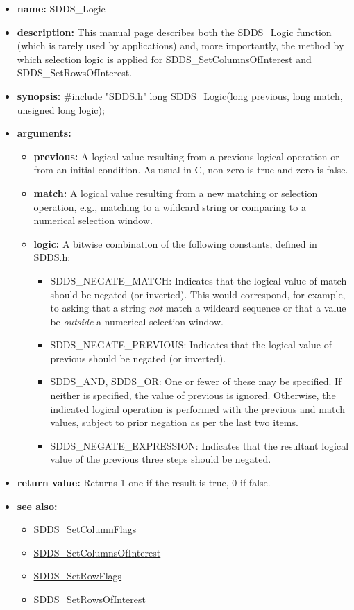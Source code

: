 \documentclass[11pt]{article}
\newcommand{\progref}[1]{\hyperref{SDDS_#1}{{\tt SDDS\_#1} (}{)}{SDDS_#1}}
\begin{document}
\begin{itemize}
\item {\bf name:}\newline
SDDS\_Logic
\item {\bf description:}\newline
This manual page describes both the SDDS\_Logic function (which is rarely used by applications) and, more importantly, the method by which selection logic is applied for SDDS\_SetColumnsOfInterest and SDDS\_SetRowsOfInterest.
\item {\bf synopsis:} \#include "SDDS.h"\newline
long SDDS\_Logic(long previous, long match, unsigned long logic);
\item {\bf arguments:}
\begin{itemize}
\item {\bf previous:} A logical value resulting from a previous logical operation or from an initial condition. As usual in C, non-zero is true and zero is false.
\item {\bf match:} A logical value resulting from a new matching or selection operation, e.g., matching to a wildcard string or comparing to a numerical selection window.
\item {\bf logic:} A bitwise combination of the following constants, defined in  SDDS.h:
\begin{itemize}
\item SDDS\_NEGATE\_MATCH: Indicates that the logical value of  match should be negated (or inverted). This would correspond, for example, to asking that a string {\em not} match a wildcard sequence or that a value be {\em outside} a numerical selection window.
\item SDDS\_NEGATE\_PREVIOUS: Indicates that the logical value of  previous should be negated (or inverted).
\item SDDS\_AND, SDDS\_OR: One or fewer of these may be specified. If neither is specified, the value of  previous is ignored. Otherwise, the indicated logical operation is performed with the  previous and  match values, subject to prior negation as per the last two items.
\item SDDS\_NEGATE\_EXPRESSION: Indicates that the resultant logical value of the previous three steps should be negated.
\end{itemize}
\end{itemize}
\item {\bf return value:}\newline
Returns 1 one if the result is true, 0 if false.
\item {\bf see also:}
\begin{itemize}
\item \progref{SetColumnFlags}
\item \progref{SetColumnsOfInterest}
\item \progref{SetRowFlags}
\item \progref{SetRowsOfInterest}
\end{itemize}
\end{itemize}
\end{document}
